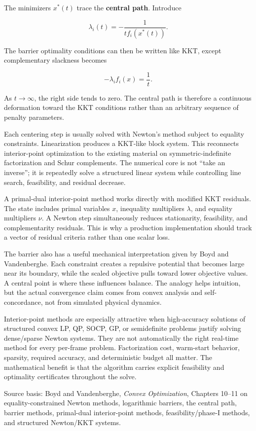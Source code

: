 The minimizers \(x^*(t)\) trace the \textbf{central path}. Introduce

\[
\lambda_i(t)
=
-\frac{1}{t f_i(x^*(t))}.
\]

The barrier optimality conditions can then be written like KKT, except complementary slackness becomes

\[
-\lambda_i f_i(x)=\frac{1}{t}.
\]

As \(t\rightarrow\infty\), the right side tends to zero. The central path is therefore a continuous deformation toward the KKT conditions rather than an arbitrary sequence of penalty parameters.

Each centering step is usually solved with Newton's method subject to equality constraints. Linearization produces a KKT-like block system. This reconnects interior-point optimization to the existing material on symmetric-indefinite factorization and Schur complements. The numerical core is not ``take an inverse''; it is repeatedly solve a structured linear system while controlling line search, feasibility, and residual decrease.

A primal-dual interior-point method works directly with modified KKT residuals. The state includes primal variables \(x\), inequality multipliers \(\lambda\), and equality multipliers \(\nu\). A Newton step simultaneously reduces stationarity, feasibility, and complementarity residuals. This is why a production implementation should track a vector of residual criteria rather than one scalar loss.

The barrier also has a useful mechanical interpretation given by Boyd and Vandenberghe. Each constraint creates a repulsive potential that becomes large near its boundary, while the scaled objective pulls toward lower objective values. A central point is where these influences balance. The analogy helps intuition, but the actual convergence claim comes from convex analysis and self-concordance, not from simulated physical dynamics.

Interior-point methods are especially attractive when high-accuracy solutions of structured convex LP, QP, SOCP, GP, or semidefinite problems justify solving dense/sparse Newton systems. They are not automatically the right real-time method for every per-frame problem. Factorization cost, warm-start behavior, sparsity, required accuracy, and deterministic budget all matter. The mathematical benefit is that the algorithm carries explicit feasibility and optimality certificates throughout the solve.

Source basis: Boyd and Vandenberghe, \emph{Convex Optimization}, Chapters 10--11 on equality-constrained Newton methods, logarithmic barriers, the central path, barrier methods, primal-dual interior-point methods, feasibility/phase-I methods, and structured Newton/KKT systems.


